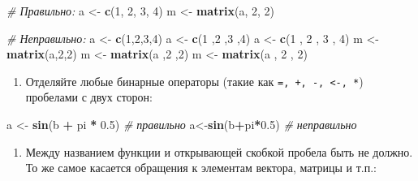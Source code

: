 \documentclass[]{book}
\newenvironment{Shaded}{\begin{snugshade}}{\end{snugshade}}
\newcommand{\KeywordTok}[1]{\textcolor[rgb]{0.13,0.29,0.53}{\textbf{#1}}}
\newcommand{\DecValTok}[1]{\textcolor[rgb]{0.00,0.00,0.81}{#1}}
\newcommand{\FloatTok}[1]{\textcolor[rgb]{0.00,0.00,0.81}{#1}}
\newcommand{\StringTok}[1]{\textcolor[rgb]{0.31,0.60,0.02}{#1}}
\newcommand{\CommentTok}[1]{\textcolor[rgb]{0.56,0.35,0.01}{\textit{#1}}}
\newcommand{\OperatorTok}[1]{\textcolor[rgb]{0.81,0.36,0.00}{\textbf{#1}}}
\newcommand{\NormalTok}[1]{#1}
\providecommand{\tightlist}{%
  \setlength{\itemsep}{0pt}\setlength{\parskip}{0pt}}
\begin{document}
\begin{Shaded}
\begin{Highlighting}[]
\CommentTok{# Правильно:}
\NormalTok{a <-}\StringTok{ }\KeywordTok{c}\NormalTok{(}\DecValTok{1}\NormalTok{, }\DecValTok{2}\NormalTok{, }\DecValTok{3}\NormalTok{, }\DecValTok{4}\NormalTok{)}
\NormalTok{m <-}\StringTok{ }\KeywordTok{matrix}\NormalTok{(a, }\DecValTok{2}\NormalTok{, }\DecValTok{2}\NormalTok{)}

\CommentTok{# Неправильно:}
\NormalTok{a <-}\StringTok{ }\KeywordTok{c}\NormalTok{(}\DecValTok{1}\NormalTok{,}\DecValTok{2}\NormalTok{,}\DecValTok{3}\NormalTok{,}\DecValTok{4}\NormalTok{)}
\NormalTok{a <-}\StringTok{ }\KeywordTok{c}\NormalTok{(}\DecValTok{1}\NormalTok{ ,}\DecValTok{2}\NormalTok{ ,}\DecValTok{3}\NormalTok{ ,}\DecValTok{4}\NormalTok{)}
\NormalTok{a <-}\StringTok{ }\KeywordTok{c}\NormalTok{(}\DecValTok{1}\NormalTok{ , }\DecValTok{2}\NormalTok{ , }\DecValTok{3}\NormalTok{ , }\DecValTok{4}\NormalTok{)}
\NormalTok{m <-}\StringTok{ }\KeywordTok{matrix}\NormalTok{(a,}\DecValTok{2}\NormalTok{,}\DecValTok{2}\NormalTok{)}
\NormalTok{m <-}\StringTok{ }\KeywordTok{matrix}\NormalTok{(a ,}\DecValTok{2}\NormalTok{ ,}\DecValTok{2}\NormalTok{)}
\NormalTok{m <-}\StringTok{ }\KeywordTok{matrix}\NormalTok{(a , }\DecValTok{2}\NormalTok{ , }\DecValTok{2}\NormalTok{)}
\end{Highlighting}
\end{Shaded}

\begin{enumerate}
\def\labelenumi{\arabic{enumi}.}
\setcounter{enumi}{2}
\tightlist
\item
  Отделяйте любые бинарные операторы (такие как
  \texttt{=,\ +,\ -,\ \textless{}-,\ *}) пробелами с двух сторон:
\end{enumerate}

\begin{Shaded}
\begin{Highlighting}[]
\NormalTok{a <-}\StringTok{ }\KeywordTok{sin}\NormalTok{(b }\OperatorTok{+}\StringTok{ }\NormalTok{pi }\OperatorTok{*}\StringTok{ }\FloatTok{0.5}\NormalTok{) }\CommentTok{# правильно}
\NormalTok{a<-}\KeywordTok{sin}\NormalTok{(b}\OperatorTok{+}\NormalTok{pi}\OperatorTok{*}\FloatTok{0.5}\NormalTok{) }\CommentTok{# неправильно}
\end{Highlighting}
\end{Shaded}

\begin{enumerate}
\def\labelenumi{\arabic{enumi}.}
\setcounter{enumi}{3}
\tightlist
\item
  Между названием функции и открывающей скобкой пробела быть не должно.
  То же самое касается обращения к элементам вектора, матрицы и т.п.:
\end{enumerate}
\end{document}
